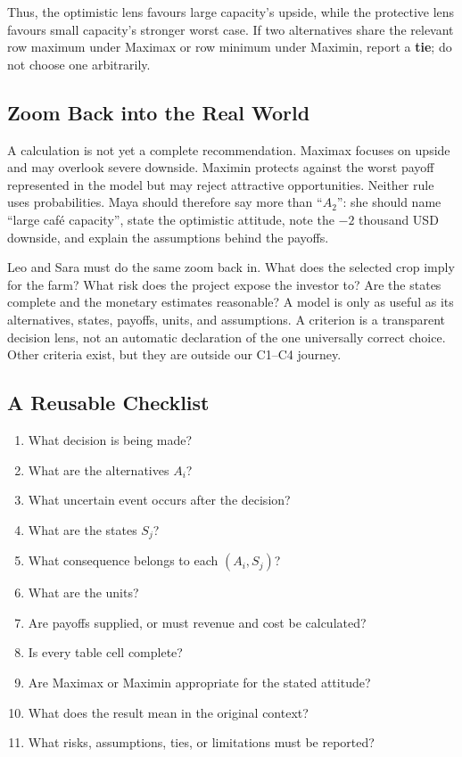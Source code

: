 	Thus, the optimistic lens favours large capacity's upside, while the protective
	lens favours small capacity's stronger worst case. If two alternatives share
	the relevant row maximum under Maximax or row minimum under Maximin, report a
	\textbf{tie}; do not choose one arbitrarily.
	
	
	
	\subsection{Zoom Back into the Real World}
	\label{sec:real-world-interpretation}
	
	A calculation is not yet a complete recommendation. Maximax focuses on upside
	and may overlook severe downside. Maximin protects against the worst payoff
	represented in the model but may reject attractive opportunities. Neither rule
	uses probabilities. Maya should therefore say more than ``\(A_2\)'': she
	should name ``large café capacity'', state the optimistic attitude, note the
	\(-2\) thousand USD downside, and explain the assumptions behind the payoffs.
	
	Leo and Sara must do the same zoom back in. What does the selected crop imply
	for the farm? What risk does the project expose the investor to? Are the states
	complete and the monetary estimates reasonable? A model is only as useful as
	its alternatives, states, payoffs, units, and assumptions. A criterion is a
	transparent decision lens, not an automatic declaration of the one universally
	correct choice. Other criteria exist, but they are outside our C1--C4 journey.
	
	
	
	\subsection{A Reusable Checklist}
	\label{sec:reusable-checklist}
	\begin{enumerate}[label=\textbf{\arabic*.},leftmargin=2em]
		\item What decision is being made?
		\item What are the alternatives \(A_i\)?
		\item What uncertain event occurs after the decision?
		\item What are the states \(S_j\)?
		\item What consequence belongs to each \((A_i,S_j)\)?
		\item What are the units?
		\item Are payoffs supplied, or must revenue and cost be calculated?
		\item Is every table cell complete?
		\item Are Maximax or Maximin appropriate for the stated attitude?
		\item What does the result mean in the original context?
		\item What risks, assumptions, ties, or limitations must be reported?
	\end{enumerate}
	
